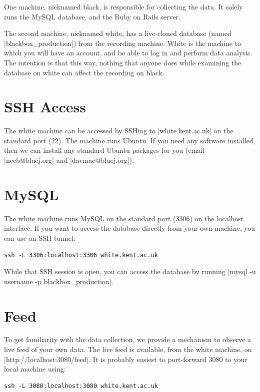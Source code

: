 \documentclass{report}
\begin{document}
One machine, nicknamed black, is
responsible for collecting the data.  It solely runs the MySQL database, and
the Ruby on Rails server.  

The second machine, nicknamed white, has a live-cloned database (named |blackbox_production|) from the recording
machine.  White is the machine to which you will have an account, and be able
to log in and perform data analysis.  The intention is that this way, nothing
that anyone does while examining the database on white can affect the
recording on black.

\section{SSH Access}

The white machine can be accessed by SSHing to |white.kent.ac.uk| on the
standard port (22).  The machine runs Ubuntu.  If you need any software
installed, then we can install any standard Ubuntu packages for you (email
|nccb@bluej.org| and |davmac@bluej.org|).

\section{MySQL}

The white machine runs MySQL on the standard port (3306) on the localhost
interface.  If you want to access the database directly from your own machine,
you can use an SSH tunnel:

\begin{lstlisting}
ssh -L 3306:localhost:3306 white.kent.ac.uk
\end{lstlisting}

While that SSH session is open, you can access the database by running
|mysql -u username -p blackbox_production|.

\section{Feed}

To get familiarity with the data collection, we provide a mechanism to observe
a live feed of your own data.  The live feed is available, from the
white machine, on |http://localhost:3080/feed|.  It is probably easiest to
port-forward 3080 to your local machine using:

\begin{lstlisting}
ssh -L 3080:localhost:3080 white.kent.ac.uk
\end{lstlisting}
\end{document}

